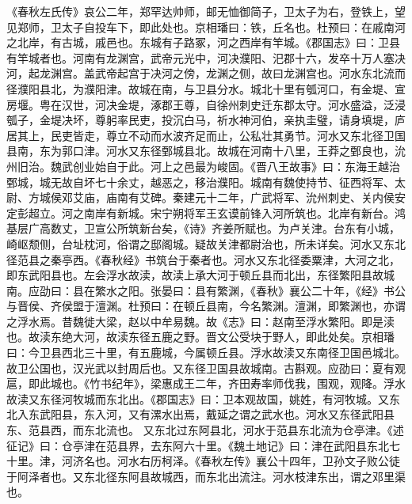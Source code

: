 \documentclass[12pt,UTF8]{ctexbook}
\begin{document}
《春秋左氏传》哀公二年，郑罕达帅师，邮无恤御简子，卫太子为右，登铁上，望见郑师，卫太子自投车下，即此处也。京相璠曰：铁，丘名也。杜预曰：在戚南河之北岸，有古城，戚邑也。东城有子路冢，河之西岸有竿城。《郡国志》曰：卫县有竿城者也。河南有龙渊宫，武帝元光中，河决濮阳、汜郡十六，发卒十万人塞决河，起龙渊宫。盖武帝起宫于决河之傍，龙渊之侧，故曰龙渊宫也。河水东北流而径濮阳县北，为濮阳津。故城在南，与卫县分水。城北十里有瓠河口，有金堤、宣房堰。粤在汉世，河决金堤，涿郡王尊，自徐州刺史迁东郡太守。河水盛溢，泛浸瓠子，金堤决坏，尊躬率民吏，投沉白马，祈水神河伯，亲执圭璧，请身填堤，庐居其上，民吏皆走，尊立不动而水波齐足而止，公私壮其勇节。河水又东北径卫国县南，东为郭口津。河水又东径鄄城县北。故城在河南十八里，王莽之鄄良也，沇州旧治。魏武创业始自于此。河上之邑最为峻固。《晋八王故事》曰：东海王越治鄄城，城无故自坏七十余丈，越恶之，移治濮阳。城南有魏使持节、征西将军、太尉、方城侯邓艾庙，庙南有艾碑。秦建元十二年，广武将军、沇州刺史、关内侯安定彭超立。河之南岸有新城。宋宁朔将军王玄谟前锋入河所筑也。北岸有新台。鸿基层广高数丈，卫宣公所筑新台矣，《诗》齐姜所赋也。为卢关津。台东有小城，崎岖颓侧，台址枕河，俗谓之邸阁城。疑故关津都尉治也，所未详矣。河水又东北径范县之秦亭西。《春秋经》书筑台于秦者也。河水又东北径委粟津，大河之北，即东武阳县也。左会浮水故渎，故渎上承大河于顿丘县而北出，东径繁阳县故城南。应劭曰：县在繁水之阳。张晏曰：县有繁渊，《春秋》襄公二十年，《经》书公与晋侯、齐侯盟于澶渊。杜预曰：在顿丘县南，今名繁渊。澶渊，即繁渊也，亦谓之浮水焉。昔魏徙大梁，赵以中牟易魏。故《志》曰：赵南至浮水繁阳。即是渎也。故渎东绝大河，故渎东径五鹿之野。晋文公受块于野人，即此处矣。京相璠曰：今卫县西北三十里，有五鹿城，今属顿丘县。浮水故渎又东南径卫国邑城北。故卫公国也，汉光武以封周后也。又东径卫国县故城南。古斟观。应劭曰：夏有观扈，即此城也。《竹书纪年》，梁惠成王二年，齐田寿率师伐我，围观，观降。浮水故渎又东径河牧城而东北出。《郡国志》曰：卫本观故国，姚姓，有河牧城。又东北入东武阳县，东入河，又有漯水出焉，戴延之谓之武水也。河水又东径武阳县东、范县西，而东北流也。
又东北过东阿县北，河水于范县东北流为仓亭津。《述征记》曰：仓亭津在范县界，去东阿六十里。《魏土地记》曰：津在武阳县东北七十里。津，河济名也。河水右历柯泽。《春秋左传》襄公十四年，卫孙文子败公徒于阿泽者也。又东北径东阿县故城西，而东北出流注。河水枝津东出，谓之邓里渠也。
\end{document}
